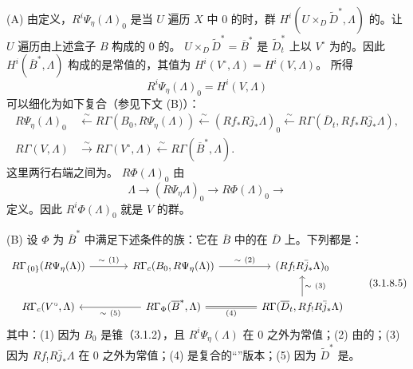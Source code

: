 (A) 由定义，$R^i\Psi_\eta(\Lambda)_0$ 是当 $U$ 遍历 $X$ 中 $0$ 的时，群 $H^i(U\times_D\widetilde D^*,\Lambda)$ 的。让 $U$ 遍历由上述盒子 $B$ 构成的 $0$ 的。 $U\times_D\widetilde D^*=\overline B^*$ 是 $\widetilde D_t^*$ 上以 $V^\circ$ 为的。因此 $H^i(\overline B^*,\Lambda)$ 构成的是常值的，其值为 $H^i(V^\circ,\Lambda)=H^i(V,\Lambda)$。
所得
\[
 R^i\Psi_\eta(\Lambda)_0=H^i(V,\Lambda)\tag{3.1.8.3}
\]
可以细化为如下复合（参见下文 (B)）：
\begin{equation}
\begin{aligned}
 R\Psi_\eta(\Lambda)_0
 &\xleftarrow{\sim}R\Gamma(B_0,R\Psi_\eta(\Lambda))
 \xleftarrow{\sim}(Rf_*R\bar j_*\Lambda)_0
 \xleftarrow{\sim}R\Gamma(\overline D_t,Rf_*R\bar j_*\Lambda),\\
 R\Gamma(V,\Lambda)&\xrightarrow{\sim}R\Gamma(V^\circ,\Lambda)
 \xleftarrow{\sim}R\Gamma(\overline B^*,\Lambda).
\end{aligned}\tag{3.1.8.4}
\end{equation}
这里两行右端之间为。 $R\Phi(\Lambda)_0$ 由
\[
 \Lambda\longrightarrow(R\Psi_\eta\Lambda)_0\longrightarrow R\Phi(\Lambda)_0\longrightarrow
\]
定义。因此 $R^i\Phi(\Lambda)_0$ 就是 $V$ 的群。

(B) 设 $\Phi$ 为 $\overline B^*$ 中满足下述条件的族：它在 $\overline B$ 中的在 $\overline D$ 上。下列都是：
\[
\begin{tikzcd}[column sep=large]
 R\Gamma_{\{0\}}(R\Psi_\eta(\Lambda))\arrow[r,"\sim\ (1)"]&R\Gamma_c(B_0,R\Psi_\eta(\Lambda))\arrow[r,"\sim\ (2)"]&(Rf_!R\bar j_*\Lambda)_0\\
 R\Gamma_c(V^\circ,\Lambda)&R\Gamma_\Phi(\overline B^*,\Lambda)\arrow[l,"\sim\ (5)"]&R\Gamma(\overline D_t,Rf_!R\bar j_*\Lambda)\arrow[u,"\sim\ (3)"']\arrow[l,equal,"(4)"]
\end{tikzcd}\tag{3.1.8.5}
\]
其中：(1) 因为 $B_0$ 是锥（3.1.2），且 $R^i\Psi_\eta(\Lambda)$ 在 $0$ 之外为常值；(2) 由的；(3) 因为 $Rf_!R\bar j_*\Lambda$ 在 $0$ 之外为常值；(4) 是复合的“”版本；(5) 因为 $\widetilde D^*$ 是。


